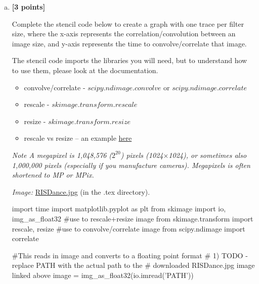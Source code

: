\begin{enumerate}[(a)]
\item
    \textbf{[3 points]}
    \begin{tcolorbox}[colback=orange!5!white,colframe=orange!75!black]
    Complete the stencil code below to create a graph with one trace per filter size, where the x-axis represents the correlation/convolution between an image size, and y-axis represents the time to convolve/correlate that image.

    The stencil code imports the libraries you will need, but to understand how to use them, please look at the documentation.
    
    \begin{itemize}
    \item convolve/correlate - \href{https://docs.scipy.org/doc/scipy/reference/generated/scipy.ndimage.convolve.html}{$scipy.ndimage.convolve$} or \href{https://docs.scipy.org/doc/scipy/reference/generated/scipy.ndimage.correlate.html}{$scipy.ndimage.correlate$}
    \item rescale - \href{https://scikit-image.org/docs/dev/api/skimage.transform.html#skimage.transform.rescale}{$skimage.transform.rescale$}
    \item resize - \href{https://scikit-image.org/docs/dev/api/skimage.transform.html#skimage.transform.resize}{$skimage.transform.resize$}
    \item rescale vs resize – an example \href{http://scikit-image.org/docs/dev/auto_examples/transform/plot_rescale.html}{here}
    \end{itemize}
    
    \end{tcolorbox}

\emph{Note A megapixel is 1,048,576 ($2^{20}$) pixels (1024$\times$1024), or sometimes also 1,000,000 pixels (especially if you manufacture cameras). Megapixels is often shortened to MP or MPix.}

\emph{Image:} \href{RISDance.jpg}{RISDance.jpg} (in the .tex directory).

\begin{python}
import time
import matplotlib.pyplot as plt
from skimage import io, img_as_float32
#use to rescale+resize image
from skimage.transform import rescale, resize
#use to convolve/correlate image
from scipy.ndimage import correlate

#This reads in image and converts to a floating point format
# 1) TODO - replace PATH with the actual path to the
#    downloaded RISDance.jpg image linked above
image = img_as_float32(io.imread('PATH'))


\end{python}
\end{enumerate}
